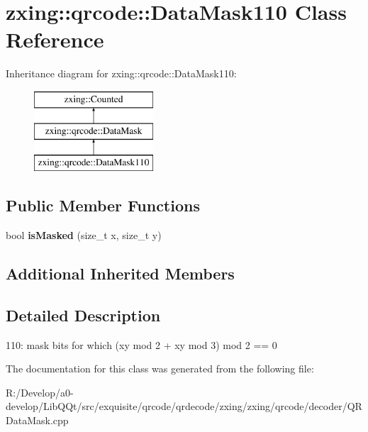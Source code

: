 \hypertarget{classzxing_1_1qrcode_1_1_data_mask110}{}\section{zxing\+:\+:qrcode\+:\+:Data\+Mask110 Class Reference}
\label{classzxing_1_1qrcode_1_1_data_mask110}
Inheritance diagram for zxing\+:\+:qrcode\+:\+:Data\+Mask110\+:\begin{figure}[H]
\begin{center}
\leavevmode
\includegraphics[height=3.000000cm]{classzxing_1_1qrcode_1_1_data_mask110}
\end{center}
\end{figure}
\subsection*{Public Member Functions}
\begin{DoxyCompactItemize}
\item 
\mbox{\label{classzxing_1_1qrcode_1_1_data_mask110_a296c7b7c05e8c894e3fb570012cc7816}} 
bool {\bfseries is\+Masked} (size\+\_\+t x, size\+\_\+t y)
\end{DoxyCompactItemize}
\subsection*{Additional Inherited Members}


\subsection{Detailed Description}
110\+: mask bits for which (xy mod 2 + xy mod 3) mod 2 == 0 

The documentation for this class was generated from the following file\+:\begin{DoxyCompactItemize}
\item 
R\+:/\+Develop/a0-\/develop/\+Lib\+Q\+Qt/src/exquisite/qrcode/qrdecode/zxing/zxing/qrcode/decoder/Q\+R\+Data\+Mask.\+cpp\end{DoxyCompactItemize}
